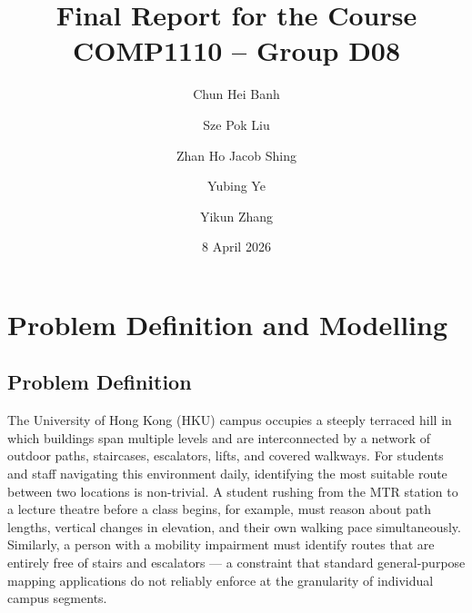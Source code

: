 \documentclass[a4paper,10pt]{amsart}
\begin{document}
\title[Final Report]{Final Report for the Course COMP1110 -- Group D08}
\newcommand{\cBanh}{C. Banh\ }
\author[\cBanh]{Chun Hei Banh}
\address{\cBanh, BEng(Elite/AI\&DataSc), 3036570233, \href{mailto:kbch@connect.hku.hk}{\texttt{kbch@connect.hku.hk}}}
%
\newcommand{\sLiu}{S. Liu\ }
\author[\sLiu]{Sze Pok Liu}
\address{\sLiu, BEng(AI\&DataSc), 3036589454, \href{mailto:u3658945@connect.hku.hk}{\texttt{u3658945@connect.hku.hk}}}
%
\newcommand{\jShing}{J. Shing\ }
\author[\jShing]{Zhan Ho Jacob Shing}
\address{\jShing, BEng(CompSc), 3036228892, \href{mailto:jacobszh@connect.hku.hk}{\texttt{jacobszh@connect.hku.hk}}}
%
\newcommand{\yYe}{Y. Ye\ }
\author[\yYe]{Yubing Ye}
\address{\yYe, BEng(CompSc), 3036291502, \href{mailto:u3629150@connect.hku.hk}{\texttt{u3629150@connect.hku.hk}}}
%
\newcommand{\yZhang}{Y. Zhang\ }
\author[\yZhang]{Yikun Zhang}
\address{\yZhang, BEng(CompSc), 3036482333, \href{mailto:pzdmmsd@connect.hku.hk}{\texttt{pzdmmsd@connect.hku.hk}}}
\date{8 April 2026}
\maketitle

\tableofcontents


\section{Problem Definition and Modelling}

\subsection{Problem Definition}

The University of Hong Kong (HKU) campus occupies a steeply terraced hill in which buildings span multiple levels and are interconnected by a network of outdoor paths, staircases, escalators, lifts, and covered walkways.
For students and staff navigating this environment daily, identifying the most suitable route between two locations is non-trivial.
A student rushing from the MTR station to a lecture theatre before a class begins, for example, must reason about path lengths, vertical changes in elevation, and their own walking pace simultaneously.
Similarly, a person with a mobility impairment must identify routes that are entirely free of stairs and escalators --- a constraint that standard general-purpose mapping applications do not reliably enforce at the granularity of individual campus segments.
\end{document}

